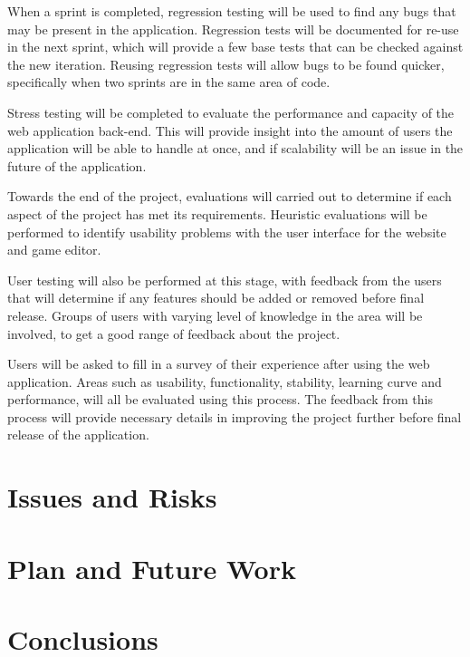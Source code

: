 \documentclass[a4paper, 12pt]{article}
\begin{document}
When a sprint is completed, regression testing will be used to find any bugs that may be present in the application. Regression tests will be documented for re-use in the next sprint, which will provide a few base tests that can be checked against the new iteration. Reusing regression tests will allow bugs to be found quicker, specifically when two sprints are in the same area of code.


Stress testing will be completed to evaluate the performance and capacity of the web application back-end. This will provide insight into the amount of users the application will be able to handle at once, and if scalability will be an issue in the future of the application.

Towards the end of the project, evaluations will carried out to determine if each aspect of the project has met its requirements. Heuristic evaluations will be performed to identify usability problems with the user interface for the website and game editor.

User testing will also be performed at this stage, with feedback from the users that will determine if any features should be added or removed before final release. Groups of users with varying level of knowledge in the area will be involved, to get a good range of feedback about the project.

Users will be asked to fill in a survey of their experience after using the web application. Areas such as usability, functionality, stability, learning curve and performance, will all be evaluated using this process. The feedback from this process will provide necessary details in improving the project further before final release of the application.

\section{Issues and Risks}
\section{Plan and Future Work}
\section{Conclusions}
\end{document}
